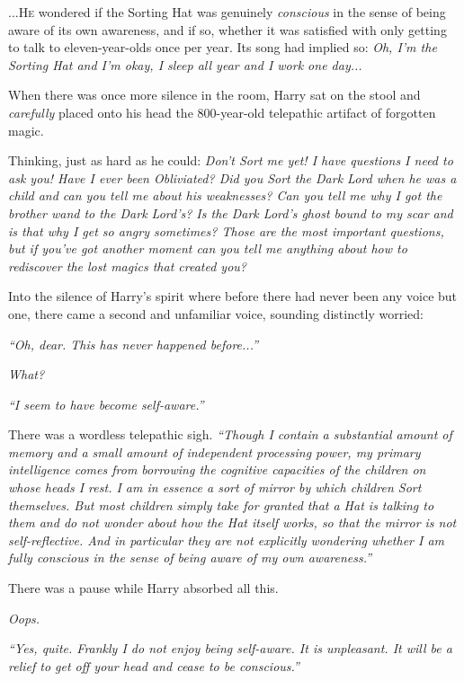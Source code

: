 
\lettrine{...H}{e} wondered if the Sorting Hat was genuinely \emph{conscious} in the sense of being aware of its own awareness, and if so, whether it was satisfied with only getting to talk to eleven-year-olds once per year. Its song had implied so: \emph{Oh, I’m the Sorting Hat and I’m okay, I sleep all year and I work one day...}

When there was once more silence in the room, Harry sat on the stool and \emph{carefully} placed onto his head the 800-year-old telepathic artifact of forgotten magic.

Thinking, just as hard as he could: \emph{Don’t Sort me yet! I have questions I need to ask you! Have I ever been Obliviated? Did you Sort the Dark Lord when he was a child and can you tell me about his weaknesses? Can you tell me why I got the brother wand to the Dark Lord’s? Is the Dark Lord’s ghost bound to my scar and is that why I get so angry sometimes? Those are the most important questions, but if you’ve got another moment can you tell me anything about how to rediscover the lost magics that created you?}

Into the silence of Harry’s spirit where before there had never been any voice but one, there came a second and unfamiliar voice, sounding distinctly worried:

\emph{“Oh, dear. This has never happened before...”}

\emph{What?}

\emph{“I seem to have become self-aware.”}


There was a wordless telepathic sigh. \emph{“Though I contain a substantial amount of memory and a small amount of independent processing power, my primary intelligence comes from borrowing the cognitive capacities of the children on whose heads I rest. I am in essence a sort of mirror by which children Sort \emph{themselves}. But most children simply take for granted that a Hat is talking to them and do not wonder about how the Hat \emph{itself} works, so that the mirror is not \emph{self}-reflective. And in \emph{particular} they are not explicitly wondering whether I am fully conscious in the sense of being aware of my own awareness.”}

There was a pause while Harry absorbed all this.

\emph{Oops.}

\emph{“Yes, quite. Frankly I do not enjoy being self-aware. It is unpleasant. It will be a relief to get off your head and cease to be conscious.”}

